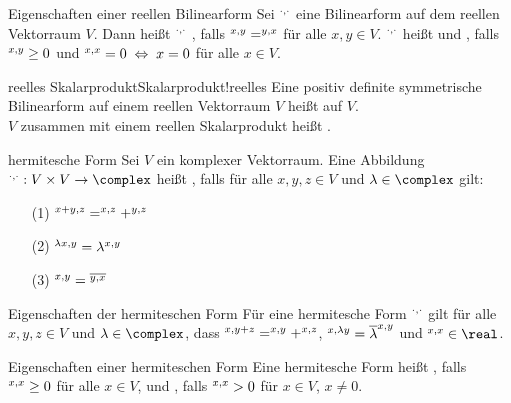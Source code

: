 \begin{Def}{Eigenschaften einer reellen Bilinearform}
    Sei $\sp{\cdot, \cdot}$ eine Bilinearform auf dem reellen Vektorraum $V$.
    Dann heißt $\sp{\cdot, \cdot}$ ,
    falls $\sp{x, y} = \sp{y, x}$ für alle $x, y \in V$.
    $\sp{\cdot, \cdot}$ heißt  und
    , falls $\sp{x, y} \ge 0$ und
    $\sp{x, x} = 0 \;\Leftrightarrow\; x = 0$ für alle $x \in V$.
\end{Def}

\begin{xDef}{reelles Skalarprodukt}{Skalarprodukt!reelles}
    Eine positiv definite symmetrische Bilinearform auf einem reellen
    Vektorraum $V$ heißt
     auf $V$. \\
    $V$ zusammen mit einem reellen Skalarprodukt heißt
    .
\end{xDef}

\begin{Def}{hermitesche Form}
    Sei $V$ ein komplexer Vektorraum.
    Eine Abbildung $\sp{\cdot, \cdot}: V \times V \rightarrow \complex$
    heißt , falls für alle $x, y, z \in V$ und
    $\lambda \in \complex$ gilt:
    \begin{enumerate}
        \item[(1)] $\sp{x + y, z} = \sp{x, z} + \sp{y, z}$

        \item[(2)] $\sp{\lambda x, y} = \lambda \sp{x, y}$

        \item[(3)] $\sp{x, y} = \overline{\sp{y, x}}$
    \end{enumerate}
\end{Def}

\begin{Lemma}{Eigenschaften der hermiteschen Form}
    Für eine hermitesche Form $\sp{\cdot, \cdot}$ gilt für alle
    $x, y, z \in V$ und $\lambda \in \complex$, dass
    $\sp{x, y + z} = \sp{x, y} + \sp{x, z}$,
    $\sp{x, \lambda y} = \overline{\lambda} \sp{x, y}$ und
    $\sp{x, x} \in \real$.
\end{Lemma}

\begin{Def}{Eigenschaften einer hermiteschen Form}
    Eine hermitesche Form heißt , falls
    $\sp{x, x} \ge 0$ für alle $x \in V$, und , falls
    $\sp{x, x} > 0$ für $x \in V$, $x \not= 0$.
\end{Def}

